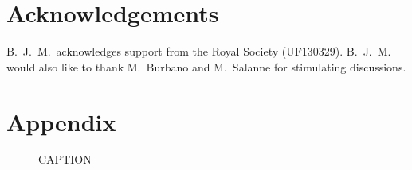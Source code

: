 \documentclass[aps,prb,twocolumn,superscriptaddress,reprint]{revtex4-1}
\begin{document}
\section{Acknowledgements}
B.\ J.\ M.\ acknowledges support from the Royal Society (UF130329). 
B.\ J.\ M. would also like to thank M.~Burbano and M.~Salanne for stimulating discussions.

\section{Appendix}

\begin{figure}[tb]
  \centering
    \caption{\label{fig:correlation_miniplots}CAPTION}
\end{figure}
\end{document}
